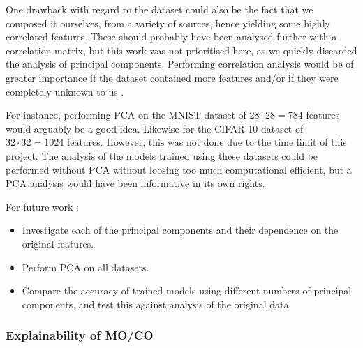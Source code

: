     One drawback with regard to the dataset could also be the fact that we composed it ourselves, from a variety of sources, hence yielding some highly correlated features. These should probably have been analysed further with a correlation matrix, but this work was not prioritised here, as we quickly discarded the analysis of principal components. Performing correlation analysis would be of greater importance if the dataset contained more features and/or if they were completely unknown to us . 

    For instance, performing PCA on the MNIST dataset of $28\cdot 28 = 784$ features would arguably be a good idea. Likewise for the CIFAR-10 dataset of $32\cdot 32 = 1024$ features. However, this was not done due to the time limit of this project. The analysis of the models trained using these datasets could be performed without PCA without loosing too much  computational efficient, but a PCA analysis would have been  informative in its own rights. 
    
    For future work :
    \begin{itemize}
        \item Investigate each of the principal components and their dependence on the original features. 
        \item Perform PCA on all datasets. 
        \item Compare the accuracy of trained models using different numbers of principal components, and test this against analysis of the original data. 
    \end{itemize}


    

\subsubsection{Explainability of MO/CO}
